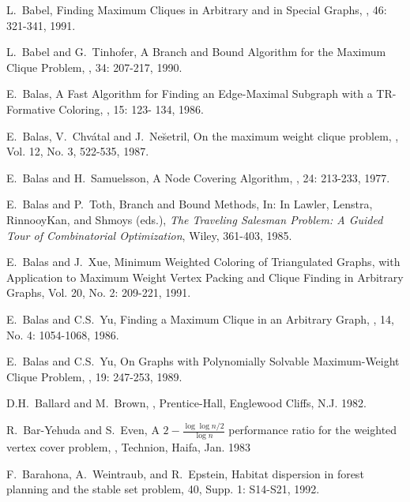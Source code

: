 \begin{thebibliography}{10}
L.~Babel,
\newblock Finding Maximum Cliques in Arbitrary and in Special Graphs,
, 46: 321-341, 1991.

L.~Babel and G.~Tinhofer,
\newblock A Branch and Bound Algorithm for the Maximum Clique  
Problem,
, 34:
207-217, 1990.

E.~Balas,
\newblock A Fast Algorithm for Finding an Edge-Maximal Subgraph with
a TR-Formative Coloring,
, 15: 123- 134, 1986.

E.~Balas, V.~Chv\'{a}tal and J.~Ne\u{s}etril, 
\newblock On the maximum weight clique problem,
, Vol. 12, No. 3,
522-535, 1987.

E.~Balas and H.~Samuelsson,
\newblock A Node Covering Algorithm,
, 24: 213-233,
1977.

E.~Balas and P.~Toth,
\newblock Branch and Bound Methods, In:
\newblock In Lawler, Lenstra, RinnooyKan, and Shmoys (eds.),
{\em The Traveling Salesman Problem: A Guided Tour of Combinatorial
Optimization}, Wiley, 361-403, 1985.

E.~Balas and J.~Xue,
\newblock Minimum Weighted Coloring of Triangulated Graphs, with
Application to Maximum Weight Vertex Packing and Clique Finding in
Arbitrary Graphs,
 Vol. 20, No. 2: 209-221, 1991.

E.~Balas and C.S.~Yu,
\newblock Finding a Maximum Clique in an Arbitrary Graph,
, 14, No. 4: 1054-1068, 1986.

E.~Balas and C.S.~Yu,
\newblock On Graphs with Polynomially Solvable Maximum-Weight Clique
Problem,
, 19: 247-253, 1989.

D.H.~Ballard and M.~Brown,
,
\newblock Prentice-Hall, Englewood Cliffs, N.J. 1982.

R.~Bar-Yehuda and S.~Even,
\newblock A $2-\frac{\log \log n/2}{\log n}$ performance ratio for
the weighted vertex cover problem,
, Technion, Haifa, Jan. 1983

F.~Barahona, A.~Weintraub, and R.~Epstein,
\newblock Habitat dispersion in forest planning and the stable set
problem,
 40, Supp. 1: S14-S21, 1992.


\end{thebibliography}
